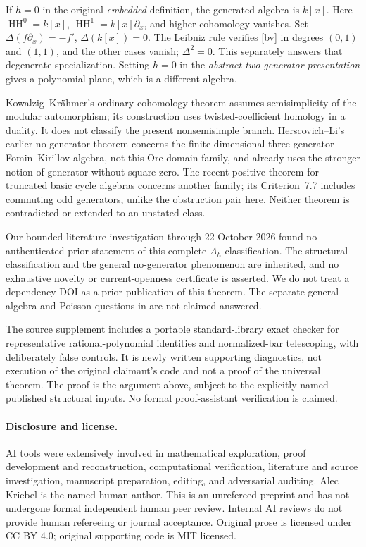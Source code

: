 \documentclass[11pt]{article}
\theoremstyle{remark}\newtheorem{remark}[theorem]{Remark}
\newcommand{\HH}{\operatorname{HH}}
\begin{document}
If \(h=0\) in the original \emph{embedded} definition, the generated
algebra is \(k[x]\). Here
\(\HH^0=k[x]\), \(\HH^1=k[x]\partial_x\), and higher cohomology vanishes.
Set \(\Delta(f\partial_x)=-f'\), \(\Delta(k[x])=0\).
The Leibniz rule verifies \eqref{bv} in degrees \((0,1)\) and \((1,1)\),
and the other cases vanish; \(\Delta^2=0\).
This separately answers that degenerate specialization.
Setting \(h=0\) in the \emph{abstract two-generator presentation} gives
a polynomial plane, which is a different algebra.

Kowalzig--Kr\"ahmer's ordinary-cohomology theorem
\cite[Theorem~1.7]{KK} assumes semisimplicity of the modular automorphism;
its construction uses twisted-coefficient homology in a duality.
It does not classify the present nonsemisimple branch.
Herscovich--Li's earlier no-generator theorem \cite{HL} concerns the
finite-dimensional three-generator Fomin--Kirillov algebra, not this
Ore-domain family, and already uses the stronger notion of generator
without square-zero. The recent positive theorem for truncated basic
cycle algebras \cite[Theorem~7.11]{BIKLZ} concerns another family;
its Criterion~7.7 includes commuting odd generators, unlike the
obstruction pair here. Neither theorem is contradicted or extended to
an unstated class.

Our bounded literature investigation through 22 October 2026 found no
authenticated prior statement of this complete \(A_h\) classification.
The structural classification and the general no-generator phenomenon
are inherited, and no exhaustive novelty or current-openness certificate
is asserted. We do not treat a dependency DOI as a prior publication of
this theorem. The separate general-algebra and Poisson questions in
\cite{OWR} are not claimed answered.

The source supplement includes a portable standard-library exact checker
for representative rational-polynomial identities and normalized-bar
telescoping, with deliberately false controls. It is newly written
supporting diagnostics, not execution of the original claimant's code
and not a proof of the universal theorem. The proof is the argument
above, subject to the explicitly named published structural inputs.
No formal proof-assistant verification is claimed.

\paragraph{Disclosure and license.}
AI tools were extensively involved in mathematical exploration, proof
development and reconstruction, computational verification, literature
and source investigation, manuscript preparation, editing, and
adversarial auditing. Alec Kriebel is the named human author.
This is an unrefereed preprint and has not undergone formal independent
human peer review. Internal AI reviews do not provide human refereeing
or journal acceptance. Original prose is licensed under CC BY 4.0;
original supporting code is MIT licensed.
\end{document}
